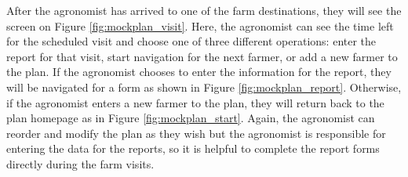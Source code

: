 \newpage
\begin{flushleft}
After the agronomist has arrived to one of the farm destinations, they will see the screen on Figure \ref{fig:mockplan_visit}. Here, the agronomist can see the time left for the scheduled visit and choose one of three different operations: enter the report for that visit, start navigation for the next farmer, or add a new farmer to the plan. If the agronomist chooses to enter the information for the report, they will be navigated for a form as shown in Figure \ref{fig:mockplan_report}. Otherwise, if the agronomist enters a new farmer to the plan, they will return back to the plan homepage as in Figure \ref{fig:mockplan_start}. Again, the agronomist can reorder and modify the plan as they wish but the agronomist is responsible for entering the data for the reports, so it is helpful to complete the report forms directly during the farm visits.
\end{flushleft}


